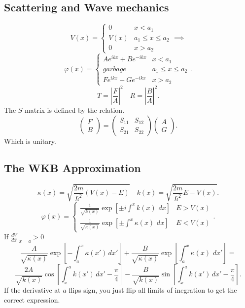 \documentclass{article}
\begin{document}
  \subsection*{Scattering and Wave mechanics}
    \[
      V(x) = 
      \begin{cases}
        0 & x < a_1 \\
        V(x) & a_1 \leq x \leq a_2 \\
        0 & x > a_2
      \end{cases} 
      \implies 
    \]
    \[
      \varphi(x) = 
      \begin{cases}
        A e^{i k x} + B e^{-i k x} & x < a_1 \\
        garbage & a_1 \leq x \leq a_2 \\
        F e^{i k x} + G e^{-i k x} & x > a_2
      \end{cases}
    .\] 
    \[
    T = \left|\frac{F}{A}\right|^2 \quad R = \left|\frac{B}{A}\right|^2
    .\]    
   The $S$ matrix is defined by the relation.
   \[
   \begin{pmatrix}
     F \\
     B
   \end{pmatrix}
   = 
   \begin{pmatrix}
     S_{11} & S_{12} \\
     S_{21} & S_{22} 
   \end{pmatrix}
   \begin{pmatrix}
     A \\
     G
   \end{pmatrix}
   .\] 
   Which is unitary.


  \subsection*{The WKB Approximation}
    \[
    \kappa(x) = \sqrt{\frac{2m}{\hbar^2}(V(x) - E)} \quad
    k(x) = \sqrt{\frac{2m}{\hbar^2} E - V(x)}
    .\]    
    \[
      \varphi(x) = 
      \begin{cases}
        \frac{1}{\sqrt{k(x)}} \exp[\pm i \int^x k(x)\,\,dx ]& E > V(x) \\
        \frac{1}{\sqrt{\kappa(x)}} \exp[\pm \int^x \kappa(x) \,\,dx] & E < V(x)
      \end{cases}
    .\] 
    If $\frac{d V}{dx}|_{x=a} > 0$ 
    \[
      \frac{A}{\sqrt{\kappa(x)}}\exp\left[ -\int_a^x \kappa(x')\,dx' \right] +
      \frac{B}{\sqrt{\kappa(x)}}\exp\left[\int_a^x \kappa(x)\,\,dx'\right] =
    \] 
    \[
      \frac{2A}{\sqrt{k(x)}}\cos\left[\int_x^a k(x')\,dx' - \frac{\pi}{4} \right] -
      \frac{B}{\sqrt{k(x)}}\sin\left[\int_x^a k(x')\,dx' - \frac{\pi}{4}\right]
    .\] 
    If the derivative at $a$ flips sign, you just flip all limits of inegration
    to get the correct expression.
\end{document}
